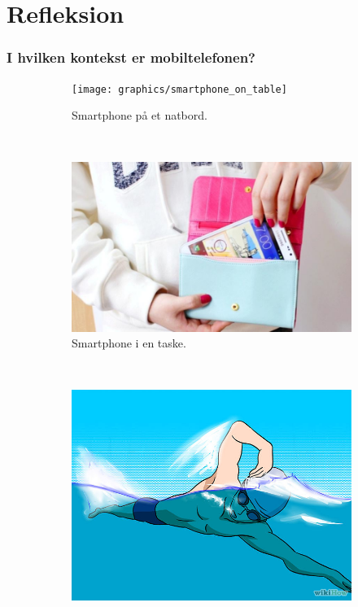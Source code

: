 \section{Refleksion}

\begin{frame}
\frametitle{I hvilken kontekst er mobiltelefonen?}
\begin{figure}
\centering
        \begin{subfigure}[b]{0.3\textwidth}
                \texttt{[image: graphics/smartphone\_on\_table]}
                \caption{Smartphone på et natbord.}
                \label{context:table}
        \end{subfigure}
        ~ %
        \begin{subfigure}[b]{0.3\textwidth}
                \includegraphics[width=\textwidth]{graphics/smartphone_in_purse}
                \caption{Smartphone i en taske.}
                \label{context:purse}
        \end{subfigure}
        ~ %
        \begin{subfigure}[b]{0.3\textwidth}
                \includegraphics[width=\textwidth]{graphics/swimmer}

\end{subfigure}
\end{figure}
\end{frame}
